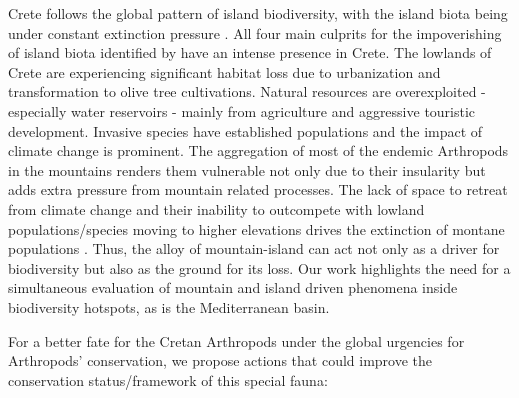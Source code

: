 Crete follows the global pattern of island biodiversity, with the island biota
being under constant extinction pressure \parencite{fernandez-palacios2021scientists,triantis2010extinction}.
All four main culprits for the impoverishing of island biota identified by
\textcite{fernandez-palacios2021scientists} have an intense presence in Crete. The
lowlands of Crete are experiencing significant habitat loss due to urbanization
and transformation to olive tree cultivations. Natural resources are
overexploited - especially water reservoirs - mainly from agriculture and
aggressive touristic development. Invasive species have established populations
\parencite{affre2010consistency,christopoulou2021how-effective,dal-cin-dagata2009a-preliminary} and the
impact of climate change is prominent. The aggregation of most of the endemic
Arthropods in the mountains renders them vulnerable not only due to their
insularity but adds extra pressure from mountain related processes. The lack of
space to retreat from climate change and their inability to outcompete with
lowland populations/species moving to higher elevations drives the extinction
of montane populations \parencite{alexander2015novel,frishkoff2019elevation,steinbauer2018accelerated,urban2018escalator,yadav2018morphological}.
Thus, the alloy of mountain-island can act not only as a driver for
biodiversity but also as the ground for its loss. Our work highlights the need
for a simultaneous evaluation of mountain and island driven phenomena inside
biodiversity hotspots, as is the Mediterranean basin.

For a better fate for the Cretan Arthropods under the global urgencies for
Arthropods’ conservation, we propose actions that could improve the
conservation status/framework of this special fauna:

